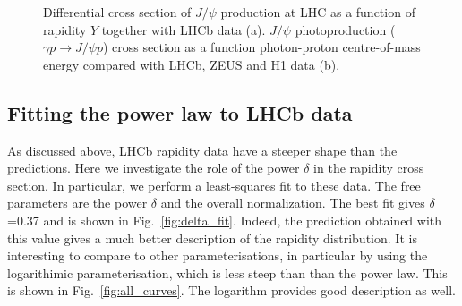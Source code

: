 \documentclass[12pt]{article}
\begin{document}
\begin{figure}[!h]
  \centering
  \caption{Differential cross section of $J/\psi$ production at LHC as a function of rapidity $Y$ together with LHCb data (a). $J/\psi$ photoproduction ($\gamma p \to J/\psi p$) cross section as a function photon-proton centre-of-mass energy compared
           with LHCb, ZEUS and H1 data (b).}
\end{figure}

\subsection{Fitting the power law to LHCb data}

As discussed above, LHCb rapidity data have a steeper shape than the predictions.
Here we investigate the role of the power $\delta$ in the rapidity cross section.
In particular, we perform a least-squares fit to these data.
The free parameters are the power $\delta$ and the overall normalization.
The best fit gives $\delta$=0.37 and is shown in Fig.~\ref{fig:delta_fit}.
Indeed, the prediction  obtained with this value gives a much better description of the rapidity distribution.
It is interesting  to compare to other parameterisations, in particular by using the
logarithimic parameterisation, which is less steep than than the power law.
This is shown  in Fig.~\ref{fig:all_curves}. The logarithm provides good description as well.
\end{document}
